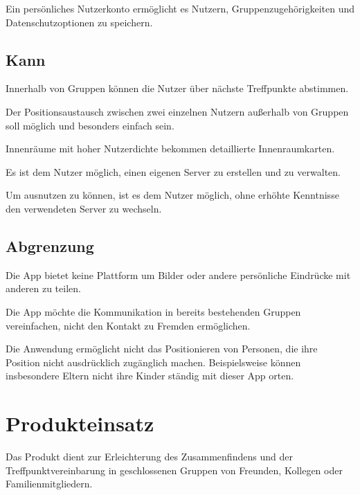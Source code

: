\documentclass[parskip=full,11pt]{scrartcl}
\begin{document}
Ein persönliches Nutzerkonto ermöglicht es Nutzern,
Gruppenzugehörigkeiten und Datenschutzoptionen zu speichern.

\subsection{Kann}
Innerhalb von Gruppen können die Nutzer über nächste Treffpunkte abstimmen.

Der Positionsaustausch zwischen zwei einzelnen Nutzern außerhalb von Gruppen
soll möglich und besonders einfach sein.

Innenräume mit hoher Nutzerdichte bekommen detaillierte Innenraumkarten.

Es ist dem Nutzer möglich, einen eigenen Server zu erstellen und zu verwalten.

Um  ausnutzen zu können, ist es dem Nutzer
möglich, ohne erhöhte Kenntnisse den verwendeten Server zu wechseln.

\subsection{Abgrenzung}
Die App bietet keine Plattform um Bilder oder andere persönliche Eindrücke mit
anderen zu teilen.

Die App möchte die Kommunikation in bereits bestehenden Gruppen vereinfachen,
nicht den Kontakt zu Fremden ermöglichen.

Die Anwendung ermöglicht nicht das Positionieren von Personen,
die ihre Position nicht ausdrücklich zugänglich machen.
Beispielsweise können insbesondere Eltern nicht ihre Kinder ständig mit dieser
App orten.

\pagebreak
\section{Produkteinsatz}
Das Produkt dient zur Erleichterung des Zusammenfindens und der
Treffpunktvereinbarung in geschlossenen Gruppen von Freunden, Kollegen oder
Familienmitgliedern.
\end{document}
